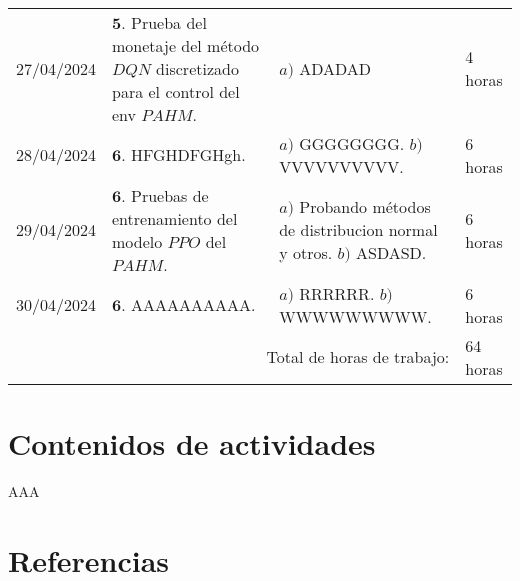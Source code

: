 \documentclass[12pt]{article}
\begin{document}
\hfill\\
\begin{minipage}[h]{\textwidth}
	\centering
	\begin{tabularx}{\textwidth}{|p{2cm}|X|X|p{2cm}|} 
		\hline		
		
	 	27/04/2024 & 
	 	$\mathbf{5}.$ Prueba del monetaje del método $DQN$ discretizado para el control del env $PAHM$. &
	 	$a)$ ADADAD \newline & 
	 	4 horas \\
	 	28/04/2024 & 
	 	$\mathbf{6}.$ HFGHDFGHgh. &
	 	$a)$ GGGGGGGG. \newline
	 	$b)$ VVVVVVVVVV. \newline & 
	 	6 horas \\
	 	29/04/2024 & 
	 	$\mathbf{6}.$ Pruebas de entrenamiento del modelo $PPO$ del $PAHM$. &
	 	$a)$ Probando métodos de distribucion normal y otros. \newline
	 	$b)$ ASDASD. \newline & 
	 	6 horas \\
	 	30/04/2024 & 
	 	$\mathbf{6}.$ AAAAAAAAAA. &
	 	$a)$ RRRRRR. \newline
	 	$b)$ WWWWWWWWW. \newline & 
	 	6 horas \\
	 	
	 	\hline
		\multicolumn{3}{|r|}{Total de horas de trabajo:} & 64 horas \\ 
	 	\hline                 
	\end{tabularx}
\end{minipage}






\section*{Contenidos de actividades}

AAA \cite{Airdaldi2023}



\newpage

\section*{Referencias}
\renewcommand\refname{}


\end{document}
